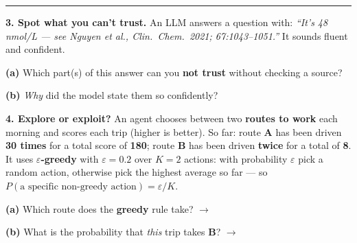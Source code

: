 \documentclass[11pt]{article}
\newif\ifsolution
\newcommand{\blk}[1]{\underline{\hspace{#1}}}
\newcommand{\rb}[2]{\ifsolution\textbf{#1}\else\blk{#2}\fi}
\newcommand{\keybox}[1]{\ifsolution\par\vspace{2pt}%
  \fbox{\parbox{0.965\textwidth}{\small\textbf{Answer.}\; #1}}\par\fi}
\newcommand{\work}[1]{\ifsolution\else\vspace{#1}\fi}
\begin{document}
\vspace{2pt}\hrule\vspace{5pt}

\textbf{3. Spot what you can't trust.}\; {\small An LLM answers a question with: \emph{``It's 48 nmol/L ---
see Nguyen et al., Clin.\ Chem.\ 2021; 67:1043--1051.''} It sounds fluent and confident.}

\vspace{3pt}
\textbf{(a)} Which part(s) of this answer can you \textbf{not trust} without checking a source?

\work{0.8cm}
\ifsolution\else\blk{\linewidth}\fi

\vspace{2pt}
\textbf{(b)} \emph{Why} did the model state them so confidently?

\work{0.8cm}
\ifsolution\else\blk{\linewidth}\fi

\keybox{(a) \textbf{Both specifics}: the \textbf{number} (48 nmol/L) \emph{and} the \textbf{citation} (Nguyen
et al., Clin.\ Chem.\ 2021). You cannot tell from the fluent wording whether either is real --- any specific
fact an LLM emits \emph{without a cited source} is unverified by construction. (b) Because an LLM is trained
to produce \textbf{plausible next tokens, not verified truth}, so a fabricated number or paper comes out with
the \emph{same} confidence as a real one --- \emph{hallucination}. The rule: treat every LLM-produced specific
(number, citation, dose) as a \textbf{draft to verify} --- ground it in RAG'd sources, require a human
sign-off --- never as the record.}

\textbf{4. Explore or exploit?}\; {\small An agent chooses between two \textbf{routes to work} each morning and scores
each trip (higher is better). So far: route \textbf{A} has been driven \textbf{30 times} for a total score of
\textbf{180}; route \textbf{B} has been driven \textbf{twice} for a total of \textbf{8}. It uses \textbf{$\varepsilon$-greedy} with $\varepsilon = 0.2$ over $K = 2$ actions: with
probability $\varepsilon$ pick a random action, otherwise pick the highest average so far --- so
$P(\text{a specific non-greedy action}) = \varepsilon / K$.}

\vspace{3pt}
\textbf{(a)} Which route does the \textbf{greedy} rule take? $\rightarrow$\ \rb{A (mean $6.0$ vs $4.0$)}{5.5cm}
\work{0.3cm}

\textbf{(b)} What is the probability that \emph{this} trip takes \textbf{B}? $\rightarrow$\
\rb{$0.2 / 2 = 0.10$}{4cm}
\work{0.3cm}
\end{document}
